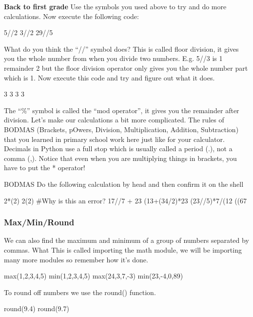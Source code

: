 \begin{exercise} \textbf{Back to first grade}
Use the symbols you used above to try and do more calculations. Now execute the following code:
\begin{shell}
5//2
3//2
29//5
\end{shell}
\end{exercise}

What do you think the “//” symbol does? This is called floor division, it gives you the whole number from when you divide two numbers. E.g. 5//3 is 1 remainder 2 but the floor division operator only gives you the whole number part which is 1.
Now execute this code and try and figure out what it does.
\begin{shell}
3%
3%
3%
3%
\end{shell}

The “\%” symbol is called the “mod operator”, it gives you the remainder after division.
Let’s make our calculations a bit more complicated. The rules of BODMAS (Brackets, pOwers,
Division, Multiplication, Addition, Subtraction) that you learned in primary school work here just like for your calculator. Decimals in Python use a full stop which is usually called a period (.), not a
comma (,). Notice that even when you are multiplying things in brackets, you have to put the * operator!

\begin{exercise} BODMAS
Do the following calculation by head and then confirm it on the shell
\begin{shell}

 2*(2)
 2(2) #Why is this an error?
 17//7 + 23%
 (13+(34/2)*23%
(23//5)*7/(12%
((67%
\end{shell}
\end{exercise}

\subsubsection{Max/Min/Round}
We can also find the maximum and minimum of a group of numbers separated by commas. What 
This is called importing the math module, we will be importing many more modules so remember
how it’s done. 

\begin{shell}
 max(1,2,3,4,5)
 min(1,2,3,4,5)
 max(24,3,7,-3)
 min(23,-4,0,89)
\end{shell}

To round off numbers we use the round() function. 
\begin{shell}
 round(9.4)
 round(9.7)
\end{shell}

